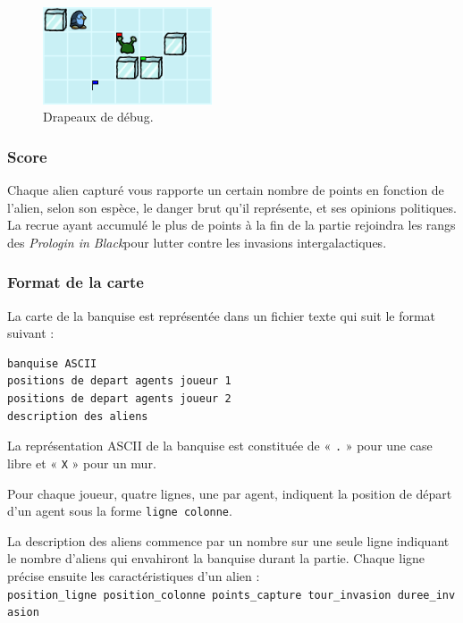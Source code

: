 \begin{figure}[!h]
    \centering
    \includegraphics[width=5cm]{img/debug_flags}
    \caption*{Drapeaux de débug.}
\end{figure}

\subsubsection{Score}\label{score}

Chaque alien capturé vous rapporte un certain nombre de points en
fonction de l'alien, selon son espèce, le danger brut qu'il représente,
et ses opinions politiques. La recrue ayant accumulé le plus de points à
la fin de la partie rejoindra les rangs des \emph{Prologin in
Black}\texttrademark pour lutter contre les invasions intergalactiques.

\subsubsection{Format de la carte}\label{format-de-la-carte}

La carte de la banquise est représentée dans un fichier texte qui suit
le format suivant :

\begin{verbatim}
banquise ASCII
positions de depart agents joueur 1
positions de depart agents joueur 2
description des aliens
\end{verbatim}

La représentation ASCII de la banquise est constituée de « \texttt{.} » pour
une case libre et « \texttt{X} » pour un mur.

Pour chaque joueur, quatre lignes, une par agent, indiquent la position
de départ d'un agent sous la forme \texttt{ligne\ colonne}.

La description des aliens commence par un nombre sur une seule ligne
indiquant le nombre d'aliens qui envahiront la banquise durant la
partie. Chaque ligne précise ensuite les caractéristiques d'un alien :
\texttt{position\_ligne\ position\_colonne\ points\_capture\ tour\_invasion\ duree\_invasion}
